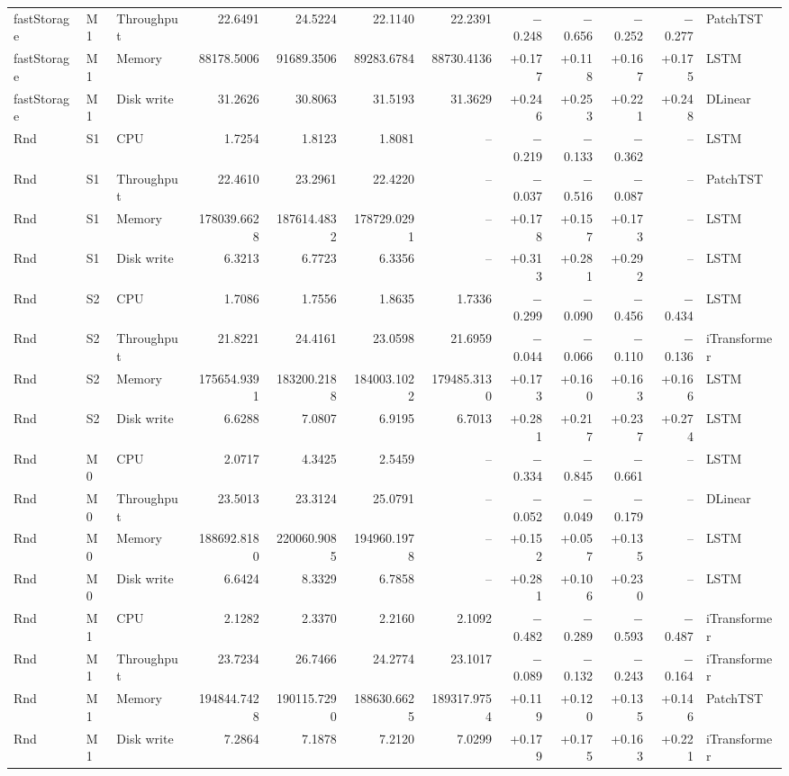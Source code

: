 \documentclass[a4paper,11pt]{article}
\begin{document}
\begin{longtable}{@{}lllrrrrrrrrl@{}}
fastStorage & M1 & Throughput & 22.6491 & 24.5224 & 22.1140 & 22.2391 & $-$0.248 & $-$0.656 & $-$0.252 & $-$0.277 & PatchTST \\
fastStorage & M1 & Memory & 88178.5006 & 91689.3506 & 89283.6784 & 88730.4136 & +0.177 & +0.118 & +0.167 & +0.175 & LSTM \\
fastStorage & M1 & Disk write & 31.2626 & 30.8063 & 31.5193 & 31.3629 & +0.246 & +0.253 & +0.221 & +0.248 & DLinear \\
Rnd & S1 & CPU & 1.7254 & 1.8123 & 1.8081 & -- & $-$0.219 & $-$0.133 & $-$0.362 & -- & LSTM \\
Rnd & S1 & Throughput & 22.4610 & 23.2961 & 22.4220 & -- & $-$0.037 & $-$0.516 & $-$0.087 & -- & PatchTST \\
Rnd & S1 & Memory & 178039.6628 & 187614.4832 & 178729.0291 & -- & +0.178 & +0.157 & +0.173 & -- & LSTM \\
Rnd & S1 & Disk write & 6.3213 & 6.7723 & 6.3356 & -- & +0.313 & +0.281 & +0.292 & -- & LSTM \\
Rnd & S2 & CPU & 1.7086 & 1.7556 & 1.8635 & 1.7336 & $-$0.299 & $-$0.090 & $-$0.456 & $-$0.434 & LSTM \\
Rnd & S2 & Throughput & 21.8221 & 24.4161 & 23.0598 & 21.6959 & $-$0.044 & $-$0.066 & $-$0.110 & $-$0.136 & iTransformer \\
Rnd & S2 & Memory & 175654.9391 & 183200.2188 & 184003.1022 & 179485.3130 & +0.173 & +0.160 & +0.163 & +0.166 & LSTM \\
Rnd & S2 & Disk write & 6.6288 & 7.0807 & 6.9195 & 6.7013 & +0.281 & +0.217 & +0.237 & +0.274 & LSTM \\
Rnd & M0 & CPU & 2.0717 & 4.3425 & 2.5459 & -- & $-$0.334 & $-$0.845 & $-$0.661 & -- & LSTM \\
Rnd & M0 & Throughput & 23.5013 & 23.3124 & 25.0791 & -- & $-$0.052 & $-$0.049 & $-$0.179 & -- & DLinear \\
Rnd & M0 & Memory & 188692.8180 & 220060.9085 & 194960.1978 & -- & +0.152 & +0.057 & +0.135 & -- & LSTM \\
Rnd & M0 & Disk write & 6.6424 & 8.3329 & 6.7858 & -- & +0.281 & +0.106 & +0.230 & -- & LSTM \\
Rnd & M1 & CPU & 2.1282 & 2.3370 & 2.2160 & 2.1092 & $-$0.482 & $-$0.289 & $-$0.593 & $-$0.487 & iTransformer \\
Rnd & M1 & Throughput & 23.7234 & 26.7466 & 24.2774 & 23.1017 & $-$0.089 & $-$0.132 & $-$0.243 & $-$0.164 & iTransformer \\
Rnd & M1 & Memory & 194844.7428 & 190115.7290 & 188630.6625 & 189317.9754 & +0.119 & +0.120 & +0.135 & +0.146 & PatchTST \\
Rnd & M1 & Disk write & 7.2864 & 7.1878 & 7.2120 & 7.0299 & +0.179 & +0.175 & +0.163 & +0.221 & iTransformer \\
\end{longtable}
\normalsize\setlength{\tabcolsep}{4pt}
\end{document}
